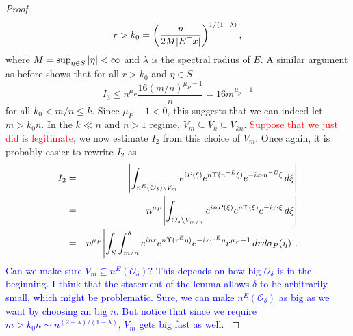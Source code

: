 \documentclass[11pt]{article}
\newcommand{\lp}{\left(}
\newcommand{\rp}{\right)}
\newcommand{\f}[2]{\frac{#1}{#2}}
\begin{document}
\begin{proof}
\begin{equation*}
    r > k_0 = \lp \f{n}{2M \abs{E^\top x}} \rp^{1/(1-\lambda)},
\end{equation*}
where $M = \sup_{\eta\in S}\abs{\eta} < \infty$ and $\lambda$ is the spectral radius of $E$. A similar argument as before shows that for all $r > k_0$ and $\eta \in S$
\begin{equation*}
    I_3 \leq n^{\mu_P}\f{16 (m/n)^{\mu_P - 1}}{n} = 16 m^{\mu_p - 1}
\end{equation*}
for all $k_0 < m/n \leq k$. Since $\mu_P - 1 < 0$, this suggests that we can indeed let $m>k_0 n$. In the $k \ll n$ and $n > 1$ regime, $V_m \subseteq V_{k} \subseteq V_{kn}$. \textcolor{red}{Suppose that we just did is legitimate,} we now estimate $I_2$ from this choice of $V_m$. Once again, it is probably easier to rewrite $I_2$ as
\begin{eqnarray*}
    I_2 
    &=& \abs{\int_{n^E(\mathcal{O}_\delta) \setminus V_m} e^{iP(\xi)} e^{n\Upsilon(n^{-E}\xi)} e^{-i x\cdot n^{-E} \xi}\,d\xi } \\
    &=& n^{\mu_P}\abs{\int_{\mathcal{O}_\delta \setminus V_{m/n}} e^{inP(\xi)} e^{n\Upsilon(\xi)} e^{-i x\cdot  \xi}\,d\xi } \\
    &=& n^{\mu_P}\abs{\int_S \int_{m/n}^{\delta} e^{i n r} e^{n \Upsilon ( r^E \eta)} e^{-i x \cdot r^E \eta} r^{\mu_P - 1} \,dr d\sigma_P(\eta)}.
\end{eqnarray*}
\textcolor{blue}{Can we make sure $V_m \subseteq n^E(\mathcal{O}_\delta)$? This depends on how big $\mathcal{O}_\delta$ is in the beginning. I think that the statement of the lemma allows $\delta$ to be arbitrarily small, which might be problematic. Sure, we can make $n^E(\mathcal{O}_\delta)$ as big as we want by choosing an big $n$. But notice that since we require $m > k_0 n \sim n^{(2-\lambda)/(1-\lambda)}$, $V_m$ gets big fast as well. }






\end{proof}
\end{document}
